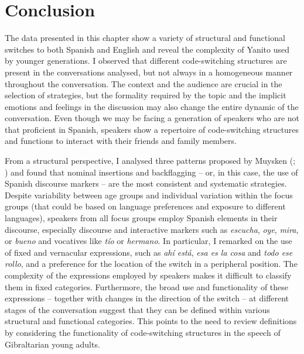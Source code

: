 \documentclass[output=paper]{langscibook}
\begin{document}
\section{Conclusion}\label{RG:sec:06}

The data presented in this chapter show a variety of structural and functional switches to both Spanish and English and reveal the complexity of Yanito used by younger generations. I observed that different code-switching structures are present in the conversations analysed, but not always in a homogeneous manner throughout the conversation. The context and the audience are crucial in the selection of strategies, but the formality required by the topic and the implicit emotions and feelings in the discussion may also change the entire dynamic of the conversation. Even though we may be facing a generation of speakers who are not that proficient in Spanish, speakers show a repertoire of code-switching structures and functions to interact with their friends and family members. 

From a structural perspective, I analysed three patterns proposed by Muysken (\citeyear{muysken_bilingual_2000}; \citeyear{muysken_language_2013}) and found that nominal insertions and backflagging – or, in this case, the use of Spanish discourse markers – are the most consistent and systematic strategies. Despite variability between age groups and individual variation within the focus groups (that could be based on language preferences and exposure to different languages), speakers from all focus groups employ Spanish elements in their discourse, especially discourse and interactive markers such as \textit{escucha}, \textit{oye}, \textit{mira}, or \textit{bueno} and vocatives like \textit{tío} or \textit{hermano}. In particular, I remarked on the use of fixed and vernacular expressions, such as \textit{ahí está}, \textit{esa es la cosa} and \textit{todo ese rollo}, and a preference for the location of the switch in a peripheral position. The complexity of the expressions employed by speakers makes it difficult to classify them in fixed categories. Furthermore, the broad use and functionality of these expressions – together with changes in the direction of the switch – at different stages of the conversation suggest that they can be defined within various structural and functional categories. This points to the need to review definitions by considering the functionality of code-switching structures in the speech of Gibraltarian young adults. 
\end{document}
